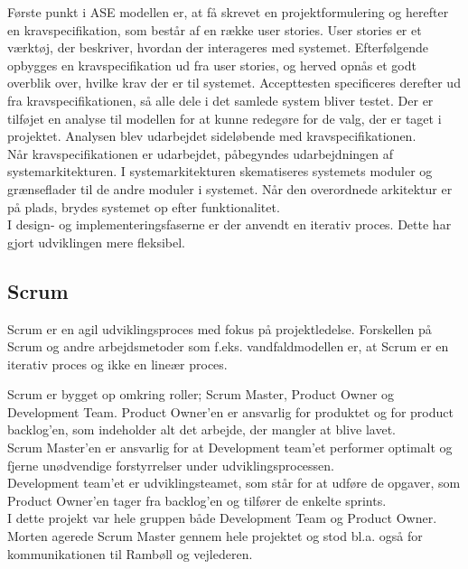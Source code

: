 Første punkt i ASE modellen er, at få skrevet en projektformulering og herefter en kravspecifikation, som består af en række user stories. User stories er et værktøj, der beskriver, hvordan der interageres med systemet. Efterfølgende opbygges en kravspecifikation ud fra user stories, og herved opnås et godt overblik over, hvilke krav der er til systemet. Accepttesten specificeres derefter ud fra kravspecifikationen, så alle dele i det samlede system bliver testet.
Der er tilføjet en analyse til modellen for at kunne redegøre for de valg, der er taget i projektet. Analysen blev udarbejdet sideløbende med kravspecifikationen. \\
Når kravspecifikationen er udarbejdet, påbegyndes udarbejdningen af systemarkitekturen. I systemarkitekturen skematiseres systemets moduler og grænseflader til de andre moduler i systemet. Når den overordnede arkitektur er på plads, brydes systemet op efter funktionalitet. \\
I design- og implementeringsfaserne er der anvendt en iterativ proces. Dette har gjort udviklingen mere fleksibel. \\

\subsection{Scrum}
Scrum \cite{Scrum} er en agil udviklingsproces med fokus på projektledelse. Forskellen på Scrum og andre arbejdsmetoder som f.eks. vandfaldmodellen\cite{Vandfald} er, at Scrum er en iterativ proces og ikke en lineær proces.

Scrum er bygget op omkring roller; Scrum Master, Product Owner og Development Team. Product Owner'en er ansvarlig for produktet og for product backlog'en, som indeholder alt det arbejde, der mangler at blive lavet\cite{Scrum}. \\
Scrum Master'en er ansvarlig for at Development team'et performer optimalt og fjerne unødvendige forstyrrelser under udviklingsprocessen. \\
Development team'et er udviklingsteamet, som står for at udføre de opgaver, som Product Owner'en tager fra backlog'en og tilfører de enkelte sprints. \\
I dette projekt var hele gruppen både Development Team og Product Owner. Morten agerede Scrum Master gennem hele projektet og stod bl.a. også for kommunikationen til Rambøll og vejlederen. \\



